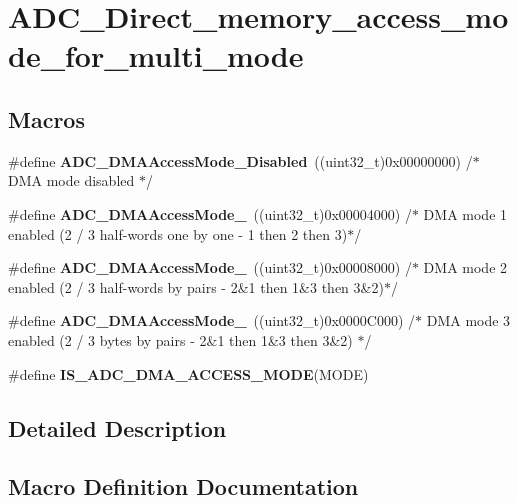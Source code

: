 \section{A\+D\+C\+\_\+\+Direct\+\_\+memory\+\_\+access\+\_\+mode\+\_\+for\+\_\+multi\+\_\+mode}
\label{group__ADC__Direct__memory__access__mode__for__multi__mode}
\subsection*{Macros}
\begin{DoxyCompactItemize}
\item 
\#define \textbf{ A\+D\+C\+\_\+\+D\+M\+A\+Access\+Mode\+\_\+\+Disabled}~((uint32\+\_\+t)0x00000000)     /$\ast$ D\+M\+A mode disabled $\ast$/
\item 
\#define \textbf{ A\+D\+C\+\_\+\+D\+M\+A\+Access\+Mode\+\_}~((uint32\+\_\+t)0x00004000)     /$\ast$ D\+M\+A mode 1 enabled (2 / 3 half-\/words one by one -\/ 1 then 2 then 3)$\ast$/
\item 
\#define \textbf{ A\+D\+C\+\_\+\+D\+M\+A\+Access\+Mode\+\_}~((uint32\+\_\+t)0x00008000)     /$\ast$ D\+M\+A mode 2 enabled (2 / 3 half-\/words by pairs -\/ 2\&1 then 1\&3 then 3\&2)$\ast$/
\item 
\#define \textbf{ A\+D\+C\+\_\+\+D\+M\+A\+Access\+Mode\+\_}~((uint32\+\_\+t)0x0000\+C000)     /$\ast$ D\+M\+A mode 3 enabled (2 / 3 bytes by pairs -\/ 2\&1 then 1\&3 then 3\&2) $\ast$/
\item 
\#define \textbf{ I\+S\+\_\+\+A\+D\+C\+\_\+\+D\+M\+A\+\_\+\+A\+C\+C\+E\+S\+S\+\_\+\+M\+O\+DE}(M\+O\+DE)
\end{DoxyCompactItemize}


\subsection{Detailed Description}


\subsection{Macro Definition Documentation}
\mbox{\label{group__ADC__Direct__memory__access__mode__for__multi__mode_gaa926422d2fe55fad4aef43a447a1db4e}} 
